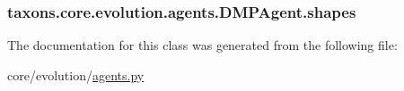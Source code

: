 \subsubsection[{\texorpdfstring{shapes}{shapes}}]{\setlength{\rightskip}{0pt plus 5cm}taxons.\+core.\+evolution.\+agents.\+D\+M\+P\+Agent.\+shapes}\hypertarget{classtaxons_1_1core_1_1evolution_1_1agents_1_1_d_m_p_agent_a6b38224a5836d08108b8b3061a1f598d}{}\label{classtaxons_1_1core_1_1evolution_1_1agents_1_1_d_m_p_agent_a6b38224a5836d08108b8b3061a1f598d}


The documentation for this class was generated from the following file\+:\begin{DoxyCompactItemize}
\item 
core/evolution/\hyperlink{agents_8py}{agents.\+py}\end{DoxyCompactItemize}
